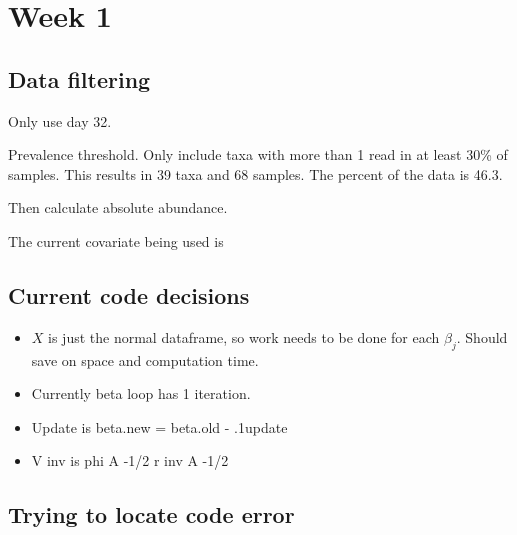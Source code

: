 \documentclass[10pt]{article}
\theoremstyle{definition}
\begin{document}
\section{Week 1}


\subsection{Data filtering}
Only use day 32.

Prevalence threshold. Only include taxa with more than 1 read in at least 30\% of samples.
This results in 39 taxa and 68 samples. The percent of the data is 46.3.

Then calculate absolute abundance.

The current covariate being used is


\subsection{Current code decisions}

\begin{itemize}
  \item $X$ is just the normal dataframe, so work needs to be done for each $\beta_j$. Should save on space and computation time.
  \item Currently beta loop has 1 iteration.
  \item Update is beta.new = beta.old - .1update
  \item V inv is phi A -1/2 r inv A -1/2
\end{itemize}



\subsection{Trying to locate code error}
\end{document}
